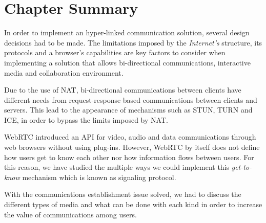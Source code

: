 \section{Chapter Summary}
\label{related:summary}

In order to implement an hyper-linked communication solution, several design decisions had to be made. The limitations imposed by the \emph{Internet's} structure, its protocols and a browser's capabilities are key factors to consider when implementing a solution that allows bi-directional communications, interactive media and collaboration environment.

Due to the use of \ac{NAT}, bi-directional communications between clients have different needs from request-response based communications between clients and servers.
This lead to the appearance of mechanisms such as \ac{STUN}, \ac{TURN} and \ac{ICE}, in order to bypass the limits imposed by \ac{NAT}.

\ac{WebRTC} introduced an \ac{API} for video, audio and data communications through web browsers without using plug-ins.
However, \ac{WebRTC} by itself does not define how users get to know each other nor how information flows between users. For this reason, we have studied the multiple ways we could implement this \emph{get-to-know} mechanism which is known as signaling protocol.

With the communications establishment issue solved, we had to discuss the different types of media and what can be done with each kind in order to increase the value of communications among users.
